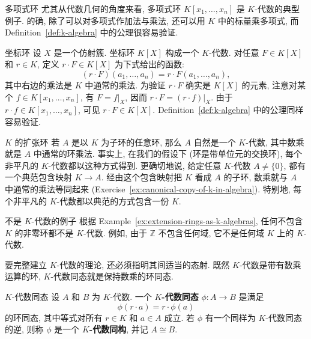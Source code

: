 \begin{Example}{多项式环}\leavevmode\label{ex:polynomial-rings-as-k-algebras}
  尤其从代数几何的角度来看, 多项式环 $K[x_{1},\ldots,x_{n}]$ 是 $K$-代数的典型例子. 的确, 除了可以对多项式作加法与乘法, 还可以用 $K$ 中的标量乘多项式, 而 Definition~\ref{def:k-algebra} 中的公理很容易验证.
\end{Example}

\begin{Example}{坐标环}\leavevmode\label{ex:coordinate-rings-as-k-algebras}
  设 $X$ 是一个仿射簇. 坐标环 $K[X]$ 构成一个 $K$-代数. 对任意 $F\in K[X]$ 和 $r\in K$, 定义 $r\cdot F\in K[X]$ 为下式给出的函数:
  \[
    (r\cdot F)(a_{1},\ldots,a_{n})=r\cdot F(a_{1},\ldots,a_{n}),
  \]
  其中右边的乘法是 $K$ 中通常的乘法. 为验证 $r\cdot F$ 确实是 $K[X]$ 的元素, 注意对某个 $f\in K[x_{1},\ldots,x_{n}]$, 有 $F=f|_{X}$, 因而 $r\cdot F=(r\cdot f)|_{X}$. 由于 $r\cdot f\in K[x_{1},\ldots,x_{n}]$, 可见 $r\cdot F\in K[X]$. Definition~\ref{def:k-algebra} 中的公理同样容易验证.
\end{Example}

\begin{Example}{$K$ 的扩张环}\leavevmode\label{ex:extension-rings-as-k-algebras}
  若 $A$ 是以 $K$ 为子环的任意环, 那么 $A$ 自然是一个 $K$-代数, 其中数乘就是 $A$ 中通常的环乘法. 事实上, 在我们的假设下 (环是带单位元的交换环), 每个非平凡的 $K$-代数都以这种方式得到. 更确切地说, 给定任意 $K$-代数 $A\ne\{0\}$, 都有一个典范包含映射 $K\to A$. 经由这个包含映射把 $K$ 看成 $A$ 的子环, 数乘就与 $A$ 中通常的乘法等同起来 (Exercise~\ref{ex:canonical-copy-of-k-in-algebra}). 特别地, 每个非平凡的 $K$-代数都以典范的方式包含一份 $K$.
\end{Example}

\begin{Example}{不是 $K$-代数的例子}\leavevmode\label{ex:integers-not-k-algebra}
  根据 Example~\ref{ex:extension-rings-as-k-algebras}, 任何不包含 $K$ 的非零环都不是 $K$-代数. 例如, 由于 $\mathbb{Z}$ 不包含任何域, 它不是任何域 $K$ 上的 $K$-代数.
\end{Example}

要完整建立 $K$-代数的理论, 还必须指明其间适当的态射. 既然 $K$-代数是带有数乘运算的环, $K$-代数同态就是保持数乘的环同态.

\begin{Definition}{$K$-代数同态}\leavevmode\label{def:k-algebra-homomorphism}
  设 $A$ 和 $B$ 为 $K$-代数. 一个 \textbf{$K$-代数同态} $\phi:A\to B$ 是满足
  \[
    \phi(r\cdot a)=r\cdot\phi(a)
  \]
  的环同态, 其中等式对所有 $r\in K$ 和 $a\in A$ 成立. 若 $\phi$ 有一个同样为 $K$-代数同态的逆, 则称 $\phi$ 是一个 \textbf{$K$-代数同构}, 并记 $A\cong B$.
\end{Definition}

